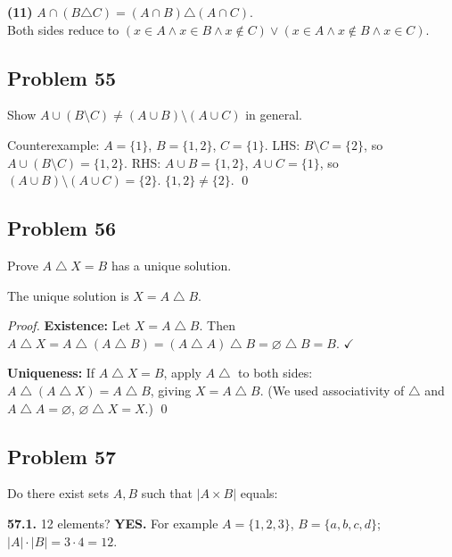 \textbf{(11)} $A \cap (B \triangle C) = (A \cap B) \triangle (A \cap C)$. \\
Both sides reduce to $(x \in A \land x \in B \land x \notin C) \lor (x \in A \land x \notin B \land x \in C)$. \checkmark

\subsection*{Problem 55}
Show $A \cup (B \setminus C) \neq (A \cup B) \setminus (A \cup C)$ in general.

Counterexample: $A = \{1\}$, $B = \{1,2\}$, $C = \{1\}$.
LHS: $B \setminus C = \{2\}$, so $A \cup (B \setminus C) = \{1,2\}$.
RHS: $A \cup B = \{1,2\}$, $A \cup C = \{1\}$, so $(A \cup B) \setminus (A \cup C) = \{2\}$.
$\{1,2\} \neq \{2\}$. \qed

\subsection*{Problem 56}
Prove $A \mathbin{\triangle} X = B$ has a unique solution.

The unique solution is $\boxed{X = A \mathbin{\triangle} B}$.

\textit{Proof.}
\textbf{Existence:} Let $X = A \mathbin{\triangle} B$. Then $A \mathbin{\triangle} X = A \mathbin{\triangle} (A \mathbin{\triangle} B) = (A \mathbin{\triangle} A) \mathbin{\triangle} B = \varnothing \mathbin{\triangle} B = B$. $\checkmark$

\textbf{Uniqueness:} If $A \mathbin{\triangle} X = B$, apply $A \mathbin{\triangle}$ to both sides: $A \mathbin{\triangle} (A \mathbin{\triangle} X) = A \mathbin{\triangle} B$, giving $X = A \mathbin{\triangle} B$. (We used associativity of $\triangle$ and $A \mathbin{\triangle} A = \varnothing$, $\varnothing \mathbin{\triangle} X = X$.) \qed

\subsection*{Problem 57}
Do there exist sets $A, B$ such that $|A \times B|$ equals:

\textbf{57.1.} 12 elements? \textbf{YES.} For example $A = \{1,2,3\}$, $B = \{a,b,c,d\}$; $|A| \cdot |B| = 3 \cdot 4 = 12$.

